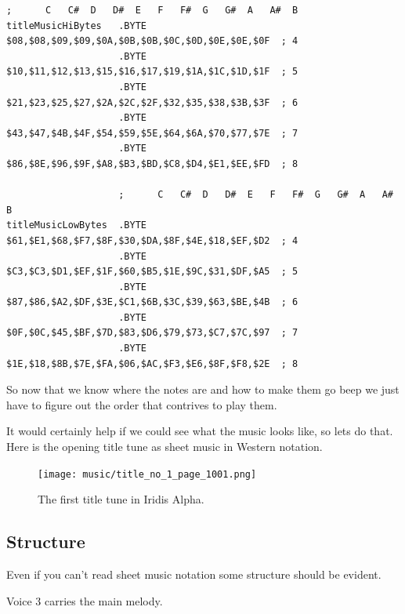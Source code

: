 \begin{lstlisting}[caption=The lookup table for all of the notes used in the theme music. The two lowest available octaves are not
used by the game. To see this for yourself\, compare the first entry in \icode{titleMusicHiBytes}/\icode{titleMusicLowBytes} (\$08 and \$61\,
giving \$0861) with the entry highlighted in red in the previous table.,basicstyle=\tiny]
                    ;      C   C#  D   D#  E   F   F#  G   G#  A   A#  B
titleMusicHiBytes   .BYTE $08,$08,$09,$09,$0A,$0B,$0B,$0C,$0D,$0E,$0E,$0F  ; 4
                    .BYTE $10,$11,$12,$13,$15,$16,$17,$19,$1A,$1C,$1D,$1F  ; 5
                    .BYTE $21,$23,$25,$27,$2A,$2C,$2F,$32,$35,$38,$3B,$3F  ; 6
                    .BYTE $43,$47,$4B,$4F,$54,$59,$5E,$64,$6A,$70,$77,$7E  ; 7
                    .BYTE $86,$8E,$96,$9F,$A8,$B3,$BD,$C8,$D4,$E1,$EE,$FD  ; 8

                    ;      C   C#  D   D#  E   F   F#  G   G#  A   A#  B
titleMusicLowBytes  .BYTE $61,$E1,$68,$F7,$8F,$30,$DA,$8F,$4E,$18,$EF,$D2  ; 4
                    .BYTE $C3,$C3,$D1,$EF,$1F,$60,$B5,$1E,$9C,$31,$DF,$A5  ; 5
                    .BYTE $87,$86,$A2,$DF,$3E,$C1,$6B,$3C,$39,$63,$BE,$4B  ; 6
                    .BYTE $0F,$0C,$45,$BF,$7D,$83,$D6,$79,$73,$C7,$7C,$97  ; 7
                    .BYTE $1E,$18,$8B,$7E,$FA,$06,$AC,$F3,$E6,$8F,$F8,$2E  ; 8
\end{lstlisting}

So now that we know where the notes are and how to make them go beep we just have to figure out the order that 
contrives to play them.

It would certainly help if we could see what the music looks like, so lets do that. Here is the opening title tune as sheet
music in Western notation.

\begin{figure}[H]
{
  \begin{adjustbox}{width=11cm,center}
  \texttt{[image: music/title\_no\_1\_page\_1001.png]}%
    \end{adjustbox}
}\caption[]{The first title tune in Iridis Alpha.}
\end{figure}

\subsection{Structure}
Even if you can't read sheet music notation some structure should be evident.

Voice 3 carries the main melody. 

